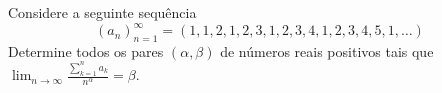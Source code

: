 Considere a seguinte sequência
\[(a_n)_{n=1}^{\infty}=(1,1,2,1,2,3,1,2,3,4,1,2,3,4,5,1,\dots)\] Determine todos os pares \((\alpha, \beta)\) de números reais positivos tais que \(\lim_{n\to \infty}\frac{\displaystyle\sum_{k=1}^n a_k}{n^{\alpha}}=\beta\).
